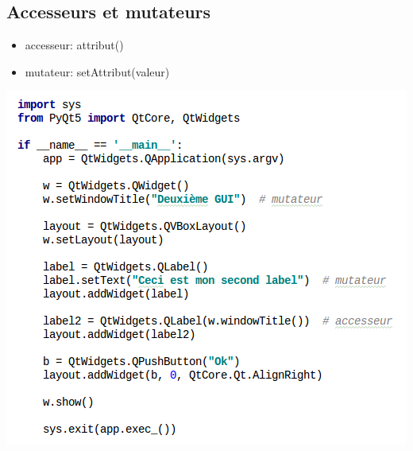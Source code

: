 \documentclass[9pt, french, brown]{beamer}
\begin{document}
\subsection{Accesseurs et mutateurs}
\begin{frame}[fragile]{\secname}{\subsecname}
\begin{itemize}
\item accesseur: attribut()
\item mutateur: setAttribut(valeur)
\end{itemize}
\begin{center}\includegraphics[height=0.7\textheight]{img/widget1_1}\end{center}
\end{frame}

\end{document}
